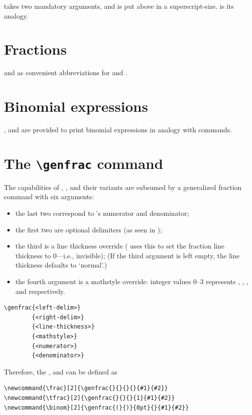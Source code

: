 \documentclass[a4paper,oneside]{book}
\newcommand{\sq}[1]{`#1'}
\newcommand{\syntax}[1]{\PVerb{#1}}
\newcommand{\command}[1]{\PVerb{#1}}
\begin{document}
\command{\overset{#1}{#2}} takes two mandatory arguments, and \syntax{#1} is put above \syntax{#2} in a superscript-size. \command{\underset} is its analogy.

\section{Fractions}
\command{\dfrac} and \command{\tfrac} as convenient abbreviations for \command{{\displaystyle\frac}} and \command{{\textstyle\frac}}.

\section{Binomial expressions}
\command{\binom}, \command{\dbinom} and \command{\tbinom} are provided to print binomial expressions in analogy with \syntax{frac} commands.

\section{The \texttt{\textbackslash genfrac} command}
The capabilities of \command{\frac}, \command{\binom}, and their variants are subsumed by a generalized fraction command \command{\genfrac} with six arguments:
\begin{itemize}
  \item the last two correspond to \command{\frac}’s numerator and denominator;
  \item the first two are optional delimiters (as seen in \command{\binom});
  \item the third is a line thickness override (\command{\binom} uses this to set the fraction line thickness to 0---i.e., invisible); (If the third argument is left empty, the line thickness defaults to \sq{normal}.)
  \item the fourth argument is a mathstyle override: integer values 0--3 represents \command{\displaystyle}, \command{\textstyle}, \command{\scriptstyle}, and \command{\scriptscriptstyle} respectively.
\end{itemize}
\begin{lstlisting}[columns=fixed,deletecomment={[s]{<}{>}}]
\genfrac{<left-delim>}
        {<right-delim>}
        {<line-thickness>}
        {<mathstyle>}
        {<numerator>}
        {<denominator>}
\end{lstlisting}

Therefore, the \command{\frac}, \command{\tfrac} and \command{\binom} can be defined as
\begin{lstlisting}
\newcommand{\frac}[2]{\genfrac{}{}{}{}{#1}{#2}}
\newcommand{\tfrac}[2]{\genfrac{}{}{}{1}{#1}{#2}}
\newcommand{\binom}[2]{\genfrac{(}{)}{0pt}{}{#1}{#2}}
\end{lstlisting}
\end{document}
